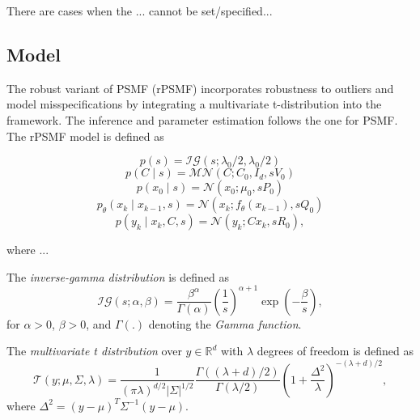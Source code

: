 \documentclass{mldsmsc}
\begin{document}
There are cases when the ... cannot be set/specified...

\subsection{Model}

The robust variant of PSMF (rPSMF) incorporates robustness to outliers and model misspecifications by integrating a multivariate t-distribution into the framework. The inference and parameter estimation follows the one for PSMF. The rPSMF model is defined as

\begin{equation}
    p(s) = \mathcal{IG}(s; \lambda_0 / 2, \lambda_0 / 2)
\end{equation}
\begin{equation}
    p(C \mid s) = \mathcal{MN}(C; C_0, I_d, sV_0)
\end{equation}
\begin{equation}
    p(x_0 \mid s) = \mathcal{N}(x_0; \mu_0, sP_0)
\end{equation}
\begin{equation}
    p_{\theta}(x_k \mid x_{k-1}, s) = \mathcal{N}(x_k; f_{\theta}(x_{k-1}), sQ_0)
\end{equation}
\begin{equation}
    p(y_k \mid x_k, C, s) = \mathcal{N}(y_k; Cx_k, sR_0),
\end{equation}

\noindent where ...

\begin{definition}
    The \textit{inverse-gamma distribution} is defined as
    \begin{equation}
        \mathcal{IG}(s; \alpha, \beta) = \frac{\beta ^ \alpha}{\Gamma(\alpha)} \left(\frac{1}{s}\right)^{\alpha + 1} \exp \left(-\frac{\beta}{s}\right),
    \end{equation}
    for $\alpha > 0$, $\beta > 0$, and $\Gamma(.)$ denoting the \textit{Gamma function}.
\end{definition}

\begin{definition}
    The \textit{multivariate t distribution} over $y \in \mathbb{R}^{d}$ with $\lambda$ degrees of freedom is defined as
    \begin{equation}
        \mathcal{T}(y; \mu, \Sigma, \lambda) = \frac{1}{(\pi \lambda)^{d/2} |\Sigma|^{1/2}} \frac{\Gamma((\lambda + d)/2)}{\Gamma(\lambda / 2)} \left(1 + \frac{\Delta^2}{\lambda}\right)^{-(\lambda + d) / 2},
    \end{equation}
    where $\Delta^2 = (y - \mu)^T \Sigma^{-1} (y-\mu)$.
\end{definition}
\end{document}
